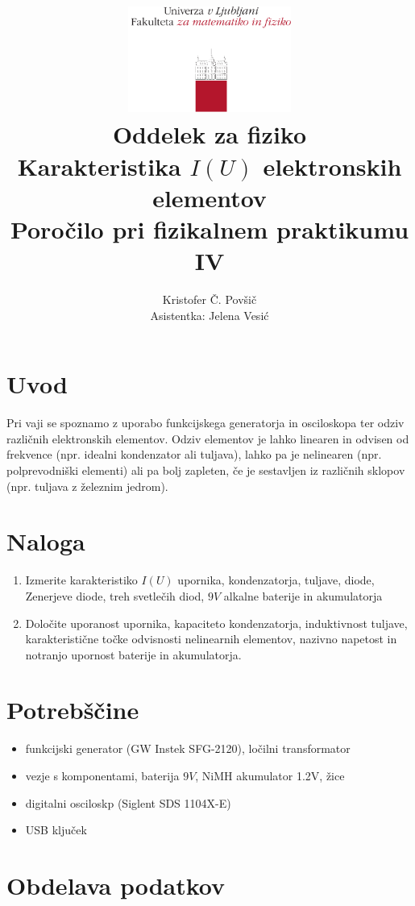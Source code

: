 \documentclass[12pt]{report}
\title{
  \includegraphics[width=0.4\textwidth]{fmf_logo}\\
  {\small Oddelek za fiziko} \\
  {Karakteristika $I(U)$ elektronskih elementov}\\
  {\small Poročilo pri fizikalnem praktikumu IV}\\

}
\date{}
\author{ Kristofer Č. Povšič \\[5 cm]
 \small  Asistentka: Jelena Vesić
}
\begin{document}
\setcounter{page}{2}

\maketitle

\chapter*{Uvod}

Pri vaji se spoznamo z uporabo funkcijskega generatorja in osciloskopa ter odziv različnih elektronskih elementov. Odziv elementov je lahko linearen in odvisen od frekvence (npr. idealni kondenzator ali tuljava), lahko pa je nelinearen (npr. polprevodniški elementi) ali pa bolj zapleten, če je sestavljen iz različnih sklopov (npr. tuljava z železnim jedrom). 

\chapter*{Naloga}
\begin{enumerate}
  \item Izmerite karakteristiko $I(U)$ upornika, kondenzatorja, tuljave, diode, Zenerjeve diode, treh svetlečih diod, $9\si{V}$ alkalne baterije in akumulatorja
  \item Določite uporanost upornika, kapaciteto kondenzatorja, induktivnost tuljave, karakteristične točke odvisnosti nelinearnih elementov, nazivno napetost in notranjo upornost baterije in akumulatorja. 
\end{enumerate}


\begingroup
\let\clearpage\relax

\chapter*{Potrebščine}
\begin{itemize}
  \item funkcijski generator (GW Instek SFG-2120), ločilni transformator
  \item vezje s komponentami, baterija $9\si{V}$, NiMH akumulator 1.2V, žice
  \item digitalni osciloskp (Siglent SDS 1104X-E)
  \item USB ključek
\end{itemize}

\endgroup

\chapter*{Obdelava podatkov}
\end{document}
